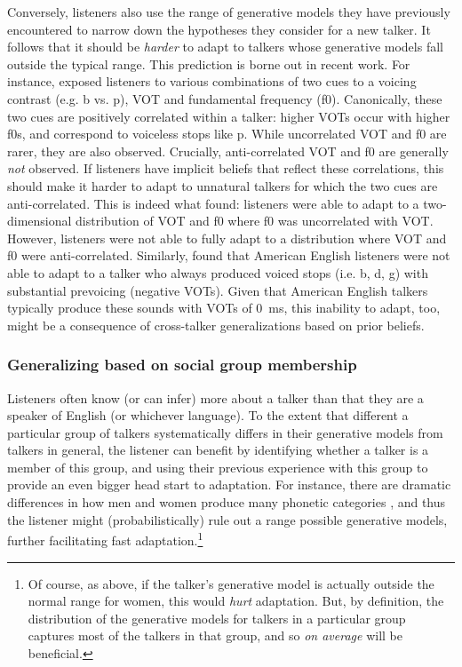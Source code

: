 Conversely, listeners also use the range of generative models they have previously encountered to narrow down the hypotheses they consider for a new talker.  It follows that it should be \emph{harder} to adapt to talkers whose generative models fall outside the typical range.  This prediction is borne out in recent work.  For instance, \textcite{Idemaru2011} exposed listeners to various combinations of two cues to a voicing contrast (e.g. \ph b vs. \ph p), VOT and fundamental frequency (f0).  Canonically, these two cues are positively correlated within a talker: higher VOTs occur with higher f0s, and correspond to voiceless stops like \ph p. While uncorrelated VOT and f0 are rarer, they are also observed. Crucially, anti-correlated VOT and f0 are generally \emph{not} observed. If listeners have implicit beliefs that reflect these correlations, this should make it harder to adapt to unnatural talkers for which the two cues are anti-correlated. This is indeed what \textcite{Idemaru2011} found: listeners were able to adapt to a two-dimensional distribution of VOT and f0 where f0 was uncorrelated with VOT.  However, listeners were not able to fully adapt to a distribution where VOT and f0 were anti-correlated. Similarly, \textcite{Sumner2011} found that American English listeners were not able to adapt to a talker who always produced voiced stops (i.e. \ph b, \ph d, \ph g) with substantial prevoicing (negative VOTs).  Given that American English talkers typically produce these sounds with VOTs of \SI{0}{\milli\second}, this inability to adapt, too, might be a consequence of cross-talker generalizations based on prior beliefs. 


\subsubsection{Generalizing based on social group membership}
\label{sec:soci-group-memb}

Listeners often know (or can infer) more about a talker than that they are a speaker of English (or whichever language).  To the extent that different a particular group of talkers systematically differs in their generative models from talkers in general, the listener can benefit by identifying whether a talker is a member of this group, and using their previous experience with this group to provide an even bigger head start to adaptation.  For instance, there are dramatic differences in how men and women produce many phonetic categories \autocite[e.g.,][]{Hillenbrand1995,Jongman2000,McMurray2011a,Newman2001}, and thus the listener might (probabilistically) rule out a range possible generative models, further facilitating fast adaptation.\footnote{Of course, as above, if the talker's generative model is actually outside the normal range for women, this would \emph{hurt} adaptation.  But, by definition, the distribution of the generative models for talkers in a particular group captures most of the talkers in that group, and so \emph{on average} will be beneficial.}  

